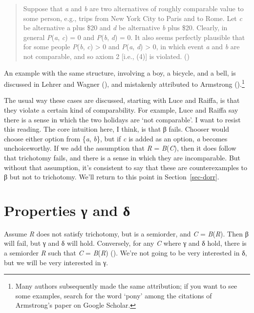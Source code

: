 \documentclass[
  11pt,
  letterpaper,
  DIV=11,
  numbers=noendperiod,
  twoside]{scrartcl}
\begin{document}
\begin{quote}
Suppose that \emph{a} and \emph{b} are two alternatives of roughly
comparable value to some person, e.g., trips from New York City to Paris
and to Rome. Let \emph{c} be alternative a plus \$20 and \emph{d} be
alternative \emph{b} plus \$20. Clearly, in general \emph{P}(\emph{a},
\emph{c}) = 0 and \emph{P}(\emph{b}, \emph{d}) = 0. It also seems
perfectly plausible that for some people \emph{P}(\emph{b}, \emph{c})
\textgreater{} 0 and \emph{P}(\emph{a}, \emph{d}) \textgreater{} 0, in
which event \emph{a} and \emph{b} are not comparable, and so axiom 2
{[}i.e., (4){]} is violated. ()
\end{quote}

An example with the same structure, involving a boy, a bicycle, and a
bell, is discussed in Lehrer and Wagner
(), and mistakenly attributed to
Armstrong ().\footnote{Many authors
  subsequently made the same attribution; if you want to see some
  examples, search for the word `pony' among the citations of
  Armstrong's paper on Google Scholar.}

The usual way these cases are discussed, starting with Luce and Raiffa,
is that they violate a certain kind of comparability. For example, Luce
and Raiffa say there is a sense in which the two holidays are `not
comparable'. I want to resist this reading. The core intuition here, I
think, is that β fails. Chooser would choose either option from
\{\emph{a}, \emph{b}\}, but if \emph{c} is added as an option, \emph{a}
becomes unchoiceworthy. If we add the assumption that \emph{R} =
\emph{B}(\emph{C}), then it does follow that trichotomy fails, and there
is a sense in which they are incomparable. But without that assumption,
it's consistent to say that these are counterexamples to β but not to
trichotomy. We'll return to this point in Section~\ref{sec-dorr}.

\section{Properties γ and δ}\label{sec-gamma}

Assume \emph{R} does not satisfy trichotomy, but is a semiorder, and
\emph{C} = \emph{B}(\emph{R}). Then β will fail, but γ and δ will hold.
Conversely, for any \emph{C} where γ and δ hold, there is a semiorder
\emph{R} such that \emph{C} = \emph{B}(\emph{R})
(). We're not going
to be very interested in δ, but we will be very interested in γ.
\end{document}
